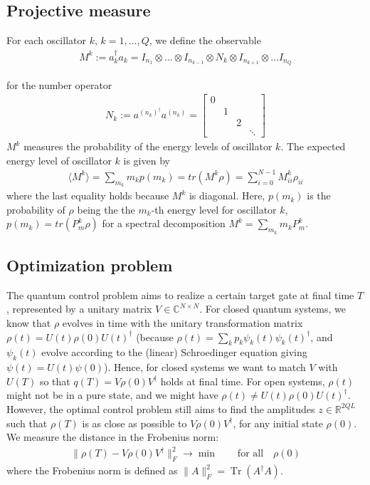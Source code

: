\documentclass[letterpaper]{article}
\DeclareMathOperator{\Tr}{Tr}
\newcommand{\R}{\mathds{R}}
\newcommand{\C}{\mathds{C}}
\begin{document}
\subsection*{Projective measure}
For each oscillator $k$, $k=1,\dots, Q$, we define the observable 
\begin{align}
  M^k := a_k^\dag a_k  = I_{n_1} \otimes \dots \otimes I_{n_{k-1}} \otimes  N_k \otimes I_{n_{k+1}} \otimes \dots I_{n_Q} 
\end{align}
       
       \quad
for the number operator 
\begin{align}
  N_k := a^{(n_k)^\dag} a^{(n_k)} = \begin{bmatrix} 
   0 &    &    & \\
     &  1 &    &\\
     &    &  2 &\\
     &    &    & \ddots 
  \end{bmatrix}
\end{align}
$M^k$ measures the probability of the energy levels of oscillator $k$. The expected energy level of oscillator $k$ is given by 
\begin{align}
  \langle M^k \rangle = \sum_{m_k} m_k p(m_k)  = tr(M^k\rho) = \sum_{i=0}^{N-1} M^k_{ii} \rho_{ii}
\end{align}
where the last equality holds because $M^k$ is diagonal. Here, $p(m_k)$ is the probability of $\rho$ being the the $m_k$-th energy level for oscillator $k$, $p(m_k) = tr(P^k_m \rho)$ for a spectral decomposition $M^k = \sum_{m_k} m_kP^k_m$. 

\subsection*{Optimization problem}
The quantum control problem aims to realize a certain target gate at final time $T$, represented by a unitary matrix $V\in \C^{N\times N}$. For closed quantum systems, we know that $\rho$ evolves in time with the unitary transformation matrix $\rho(t) = U(t)\rho(0) U(t)^{\dagger}$ (because $\rho(t) = \sum_k p_k \psi_k(t)\psi_k(t)^{\dagger}$, and $\psi_k(t)$ evolve according to the (linear) Schroedinger equation giving $\psi(t) = U(t) \psi(0)$). Hence, for closed systems we want to match $V$ with $U(T)$ so that $q(T) = V\rho(0)V^{\dagger}$ holds at final time. For open systems, $\rho(t)$ might not be in a pure state, and we might have $\rho(t) \neq U(t)\rho(0) U(t)^{\dagger}$. However, the optimal control problem still aims to find the amplitudes $z\in \R^{2QL}$ such that $\rho(T)$ is as close as possible to $V\rho(0)V^{\dagger}$, for any initial state $\rho(0)$. We measure the distance in the Frobenius norm:
\begin{align}\label{optimproblem_matrix}
 \| \rho(T) - V\rho(0)V^{\dagger} \|^2_F \rightarrow \min  \qquad \text{for all} \quad \rho(0)
\end{align} 
where the Frobenius norm is defined as $\|A\|^2_F = \Tr(A^{\dagger}A)$.
\end{document}
